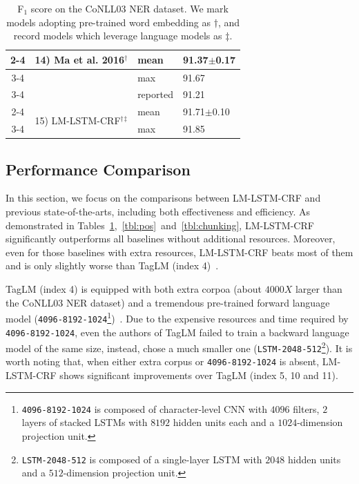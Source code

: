 \documentclass[letterpaper]{article} %
\newcommand{\our}{\textsc{LM-LSTM-CRF}\xspace}
\begin{document}
\begin{table}[t!]
{\begin{tabular}{c||l|l|l}
\cline{2-4}
& \multirow{3}{*}{14) Ma et al. 2016$^\dagger$} & mean & 91.37$\pm$0.17\\
\cline{3-4}
& & max & 91.67\\
\cline{3-4}
& & reported & 91.21\\
\cline{2-4}
& \multirow{2}{*}{15) \our$^\dagger$$^\ddagger$} & mean & 91.71$\pm$0.10 \\
\cline{3-4}
& & max & 91.85\\
\hline
\end{tabular}
}
\caption{F$_1$ score on the CoNLL03 NER dataset.
We mark models adopting pre-trained word embedding as $\dagger$, and record models which leverage language models as $\ddagger$.
}\label{tbl:ner}
\end{table}

\subsection{Performance Comparison}
In this section, we focus on the comparisons between \our and previous state-of-the-arts, including both effectiveness and efficiency.
As demonstrated in Tables~\ref{tbl:ner},~\ref{tbl:pos}~and~\ref{tbl:chunking}, \our significantly outperforms all baselines without additional resources. 
Moreover, even for those baselines with extra resources, \our beats most of them and is only slightly worse than TagLM (index 4)~\cite{peters2017semi}.

TagLM (index 4) is equipped with both extra corpoa (about $4000X$ larger than the CoNLL03 NER dataset) and a tremendous pre-trained forward language model (\texttt{4096-8192-1024}\footnote{\texttt{4096-8192-1024} is composed of character-level CNN with $4096$ filters, $2$ layers of stacked LSTMs with $8192$ hidden units each and a $1024$-dimension projection unit.})~\cite{jozefowicz2016exploring}.
Due to the expensive resources and time required by \texttt{4096-8192-1024}, even the authors of TagLM failed to train a backward language model of the same size, instead, chose a much smaller one (\texttt{LSTM-2048-512}\footnote{\texttt{LSTM-2048-512} is composed of a single-layer LSTM with $2048$ hidden units and a $512$-dimension projection unit.}).
It is worth noting that, when either extra corpus or \texttt{4096-8192-1024} is absent, \our shows significant improvements over TagLM (index 5, 10 and 11). 
\end{document}

